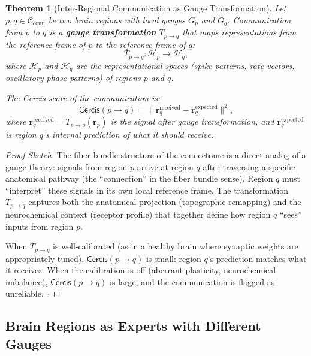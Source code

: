 \documentclass[12pt,a4paper]{article}
\newtheorem{theorem}{Theorem}[section]
\theoremstyle{remark}
\newcommand{\Cercis}{\textsf{Cercis}}
\newcommand{\Connectome}{\mathcal{C}_{\text{conn}}}
\begin{document}
\begin{theorem}[Inter-Regional Communication as Gauge Transformation]\label{thm:connectome-situs}
Let $p, q \in \Connectome$ be two brain regions with local gauges $G_p$ and
$G_q$. Communication from $p$ to $q$ is a \textbf{gauge transformation}
$T_{p \to q}$ that maps representations from the reference frame of $p$ to
the reference frame of $q$:
\begin{equation}\label{eq:gauge-transform}
    T_{p \to q}: \mathcal{H}_p \to \mathcal{H}_q,
\end{equation}
where $\mathcal{H}_p$ and $\mathcal{H}_q$ are the representational spaces
(spike patterns, rate vectors, oscillatory phase patterns) of regions $p$
and $q$.

The \Cercis{} score of the communication is:
\begin{equation}\label{eq:comm-cercis}
    \Cercis(p \to q) = \| \mathbf{r}_q^{\text{received}} - \mathbf{r}_q^{\text{expected}} \|^2,
\end{equation}
where $\mathbf{r}_q^{\text{received}} = T_{p \to q}(\mathbf{r}_p)$ is the
signal after gauge transformation, and $\mathbf{r}_q^{\text{expected}}$ is
region $q$'s internal prediction of what it should receive.
\end{theorem}

\begin{proof}[Proof Sketch]
The fiber bundle structure of the connectome is a direct analog of a gauge
theory: signals from region $p$ arrive at region $q$ after traversing a
specific anatomical pathway (the ``connection'' in the fiber bundle sense).
Region $q$ must ``interpret'' these signals in its own local reference frame.
The transformation $T_{p \to q}$ captures both the anatomical projection
(topographic remapping) and the neurochemical context (receptor profile) that
together define how region $q$ ``sees'' inputs from region $p$.

When $T_{p \to q}$ is well-calibrated (as in a healthy brain where synaptic
weights are appropriately tuned), $\Cercis(p \to q)$ is small: region $q$'s
prediction matches what it receives. When the calibration is off (aberrant
plasticity, neurochemical imbalance), $\Cercis(p \to q)$ is large, and the
communication is flagged as unreliable. $\square$
\end{proof}

\subsection{Brain Regions as Experts with Different Gauges}
\end{document}
